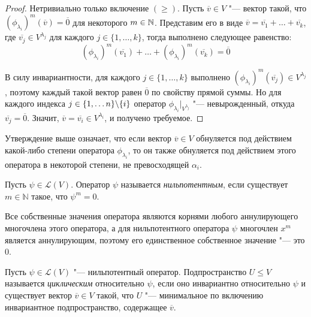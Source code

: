 \begin{proof}
	Нетривиально только включение $(\ge)$. Пусть $\overline{v} \in V$ "--- вектор такой, что $(\phi_{\lambda_i})^m(\overline{v}) = \overline{0}$ для некоторого $m \in \mathbb{N}$. Представим его в виде $\overline{v} = \overline{v_1} + \dots + \overline{v_k}$, где $\overline{v_j} \in V^{\lambda_j}$ для каждого $j \in \{1, \dotsc, k\}$, тогда выполнено следующее равенство:
	\[(\phi_{\lambda_i})^m(\overline{v_1}) + \dots +  (\phi_{\lambda_i})^m(\overline{v_k}) = \overline{0}\]
	
	В силу инвариантности, для каждого $j \in \{1, \dotsc, k\}$ выполнено $(\phi_{\lambda_i})^m(\overline{v_j}) \in V^{\lambda_j}$, поэтому каждый такой вектор равен $\overline 0$ по свойству прямой суммы. Но для каждого индекса $j \in \{1, \dotsc n\} \backslash \{i\}$ оператор $\phi_{\lambda_i}|_{V^{\lambda_j}}$ "--- невырожденный, откуда $\overline{v_j} = \overline{0}$. Значит, $\overline{v} = \overline{v_i} \in V^{\lambda_i}$, и получено требуемое.
\end{proof}

\begin{note}
	Утверждение выше означает, что если вектор $\overline{v} \in V$ обнуляется под действием какой-либо степени оператора $\phi_{\lambda_i}$, то он также обнуляется под действием этого оператора в некоторой степени, не превосходящей $\alpha_i$.
\end{note}

\begin{definition}
	Пусть $\psi \in \mathcal{L}(V)$. Оператор $\psi$ называется \textit{нильпотентным}, если существует $m \in \mathbb{N}$ такое, что $\psi^m = 0$.
\end{definition}

\begin{note}
	Все собственные значения оператора являются корнями любого аннулирующего многочлена этого оператора, а для нильпотентного оператора $\psi$ многочлен $x^m$ является аннулирующим, поэтому его единственное собственное значение "--- это $0$.
\end{note}

\begin{definition}
	Пусть $\psi \in \mathcal{L}(V)$ "--- нильпотентный оператор. Подпространство $U \le V$ называется \textit{циклическим} относительно $\psi$, если оно инвариантно относительно $\psi$ и существует вектор $\overline{v} \in V$ такой, что $U$ "--- минимальное по включению инвариантное подпространство, содержащее $\overline{v}$.
\end{definition}

